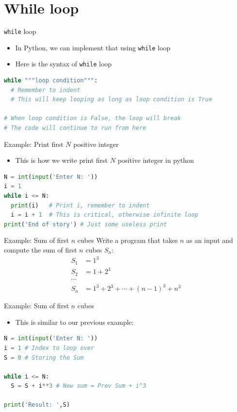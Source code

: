 \documentclass[10pt,xcolor={table,dvipsnames},t]{beamer}
\begin{document}
\section{While loop}
\begin{frame}[fragile]{\texttt{while} loop}
  \begin{itemize}
    \item In Python, we can implement that using \texttt{while} loop 
    \item Here is the syntax of \texttt{while} loop 
  \end{itemize}
\begin{lstlisting}[language=python]
while """loop condition""":
  # Remember to indent
  # This will keep looping as long as loop condition is True

# When loop condition is False, the loop will break 
# The code will continue to run from here
\end{lstlisting}
\end{frame}

\begin{frame}[fragile]{Example: Print first $N$ positive integer}
  \begin{itemize}
    \item This is how we write print first $N$ positive integer in python
  \end{itemize}
\begin{lstlisting}[language=python]
N = int(input('Enter N: '))
i = 1
while i <= N:
  print(i)   # Print i, remember to indent
  i = i + 1  # This is critical, otherwise infinite loop
print('End of story') # Just some useless print 
\end{lstlisting}
\end{frame}

\begin{frame}{Example: Sum of first $n$ cubes}
    Write a program that takes $n$ as an input and compute the sum of first $n$ cubes $S_n$:
    \begin{align*}
      S_1 &= 1^3\\
      S_2 &= 1 + 2^3\\
      \cdots \\ 
      S_n &= 1^3 + 2^3 + \cdots  + (n-1)^3 + n^3
    \end{align*}
\end{frame}

\begin{frame}[fragile]{Example: Sum of first $n$ cubes}
  \begin{itemize}
    \item This is similar to our previous example:
  \end{itemize}
\begin{lstlisting}[language=python]
N = int(input('Enter N: '))
i = 1 # Index to loop over
S = 0 # Storing the Sum

while i <= N:
  S = S + i**3 # New sum = Prev Sum + i^3

print('Result: ',S)
\end{lstlisting}
\end{frame}
\end{document}

